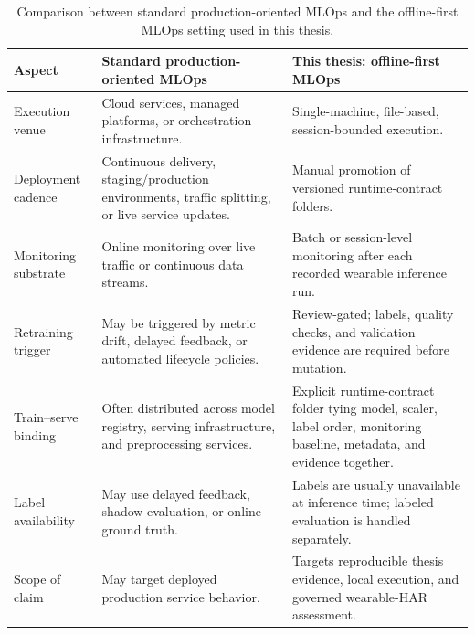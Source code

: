 \renewcommand{\arraystretch}{1.18}
\begin{table}[htbp]
\centering
\footnotesize
\caption[Comparison between standard production-oriented MLOps and the...]{Comparison between standard production-oriented MLOps and the offline-first MLOps setting used in this thesis.}
\label{tab:offline_first_comparison}
\begin{tabularx}{\textwidth}{p{3.0cm} X X}
\toprule
\textbf{Aspect} & \textbf{Standard production-oriented MLOps} & \textbf{This thesis: offline-first MLOps} \\
\midrule

Execution venue
& Cloud services, managed platforms, or orchestration infrastructure.
& Single-machine, file-based, session-bounded execution. \\

Deployment cadence
& Continuous delivery, staging/production environments, traffic splitting, or live service updates.
& Manual promotion of versioned runtime-contract folders. \\

Monitoring substrate
& Online monitoring over live traffic or continuous data streams.
& Batch or session-level monitoring after each recorded wearable inference run. \\

Retraining trigger
& May be triggered by metric drift, delayed feedback, or automated lifecycle policies.
& Review-gated; labels, quality checks, and validation evidence are required before mutation. \\

Train--serve binding
& Often distributed across model registry, serving infrastructure, and preprocessing services.
& Explicit runtime-contract folder tying model, scaler, label order, monitoring baseline, metadata, and evidence together. \\

Label availability
& May use delayed feedback, shadow evaluation, or online ground truth.
& Labels are usually unavailable at inference time; labeled evaluation is handled separately. \\

Scope of claim
& May target deployed production service behavior.
& Targets reproducible thesis evidence, local execution, and governed wearable-HAR assessment. \\

\bottomrule
\end{tabularx}
\renewcommand{\arraystretch}{1.0}
\end{table}

